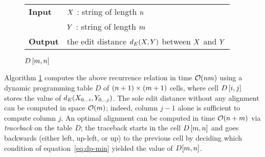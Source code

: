 \begin{figure*}[b]
\begin{center}
\begin{minipage}[t]{.9\textwidth}
\begin{algorithm}[H]
\begin{tabular}{ll}
\textbf{Input}  & $X$ : string of length $n$\\
				& $Y$ : string of length $m$\\
\textbf{Output} & the edit distance $d_E(X,Y)$ between $X$ and $Y$\\
\end{tabular}
\begin{algorithmic}[1]
\EndFor
{}
	\EndFor
\EndFor
\State \Return $D\left[m,n\right]$
\end{algorithmic}
\label{alg:dp-edit}
\end{algorithm}
\end{minipage}
\end{center}
\end{figure*}

Algorithm \ref{alg:dp-edit} computes the above recurrence relation in time $\mathcal{O}(nm)$ using a dynamic programming table $D$ of $(n+1) \times (m+1)$ cells, where cell $D\left[i,j\right]$ stores the value of $d_E({X}_{{0}\dots{i}},{Y}_{{0}\dots{j}})$.
The sole edit distance without any alignment can be computed in space $\mathcal{O}(m)$; indeed, column $j-1$ alone is sufficient to compute column $j$.
An optimal alignment can be computed in time $\mathcal{O}(n + m)$ via \emph{traceback} on the table $D$;
the traceback starts in the cell $D\left[m,n\right]$ and goes backwards (either left, up-left, or up) to the previous cell by deciding which condition of equation~\ref{eq:dp-min} yielded the value of $D[m,n]$.

